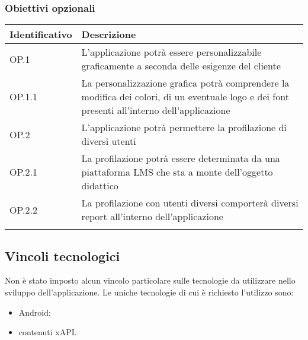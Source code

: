 \documentclass[../Tesi.tex]{subfiles}
\begin{document}
			\subsubsection{Obiettivi opzionali}
			\begin{longtabu} to \textwidth {X[0.3cm] X}
				\toprule
				\textbf{Identificativo} & \textbf{Descrizione} \\
				\midrule
				\endhead
				OP.1 & L’applicazione potrà essere personalizzabile graficamente a seconda delle esigenze del cliente  \\
				\midrule
				OP.1.1 & La personalizzazione grafica potrà comprendere la modifica dei colori, di un eventuale logo e dei font presenti all’interno dell’applicazione  \\
				\midrule
				OP.2 & L’applicazione potrà permettere la profilazione di diversi utenti  \\
				\midrule
				OP.2.1 & La profilazione potrà essere determinata da una piattaforma LMS che sta a monte dell’oggetto didattico  \\
				\midrule
				OP.2.2 & La profilazione con utenti diversi comporterà diversi report all’interno dell’applicazione \\
				\bottomrule
			\end{longtabu}

	\subsection{Vincoli tecnologici}
		Non è stato imposto alcun vincolo particolare sulle tecnologie da utilizzare nello sviluppo dell'applicazione. Le uniche tecnologie di cui è richiesto l'utilizzo sono:
		\begin{itemize}
			\item Android;
			\item contenuti xAPI.
		\end{itemize}
\end{document}
